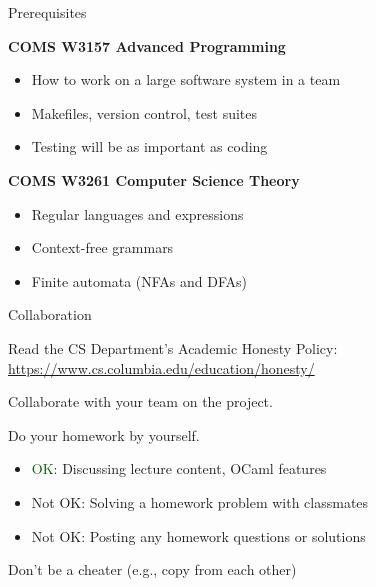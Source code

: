 \documentclass{plt}
\begin{document}
%
%
%
%
%
%
%

\begin{frame}{Prerequisites}

\textbf{COMS W3157 Advanced Programming}

\begin{itemize}

\item How to work on a large software system in a team

\item Makefiles, version control, test suites

\item Testing will be as important as coding
\end{itemize}

\textbf{COMS W3261 Computer Science Theory}

\begin{itemize}
\item Regular languages and expressions

\item Context-free grammars

\item Finite automata (NFAs and DFAs)

\end{itemize}

\end{frame}

\begin{frame}{Collaboration}

  Read the CS Department's Academic Honesty Policy:
  \url{https://www.cs.columbia.edu/education/honesty/}

Collaborate with your team on the project.

Do your homework by yourself.

\begin{itemize}
\item \textcolor{darkgreen}{OK}: Discussing lecture content, OCaml features
\item \textcolor{mRed}{Not OK}: Solving a homework problem with classmates
\item \textcolor{mRed}{Not OK}: Posting any homework questions or solutions
\end{itemize}

\alert{Don't be a cheater (e.g., copy from each other)}

\end{frame}
\end{document}
